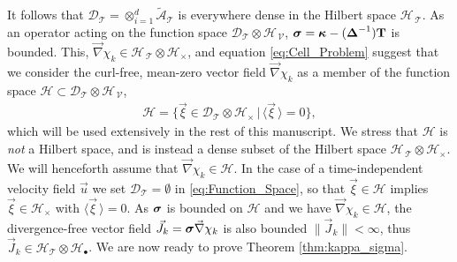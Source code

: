 \documentclass[11pt]{amsart}
\newcommand{\Tb}{\mathbf{T}}
\newcommand{\Tc}{\mathcal{T}}
\newcommand{\Vc}{\mathcal{V}}
\newcommand{\Hs}{\mathscr{H}}
\newcommand{\As}{\mathscr{A}}
\newcommand{\Ds}{\mathscr{D}}
\newcommand\bsig{\mbox{\boldmath${\sigma}$}}
\newcommand\bDelta{\mbox{\boldmath${\Delta}$}}
\newcommand\bkappa{\mbox{\boldmath${\kappa}$}}
\begin{document}
It follows that $\Ds_{\Tc}=\otimes_{i=1}^d\tilde{\As}_{\Tc}$ is everywhere
dense in the Hilbert space $\Hs_{\,\Tc}$. As an operator acting on the
function  space $\Ds_{\Tc}\otimes\Hs_{\,\Vc}$, $\bsig=\bkappa-(\bDelta^{-1})\Tb$ is
bounded. This, $\vec{\nabla}\chi_k\in\Hs_{\,\Tc}\otimes\Hs_\times$, and equation
\eqref{eq:Cell_Problem} suggest that we consider the curl-free,
mean-zero vector field $\vec{\nabla}\chi_k$ as a member of the function space 
$\Hs\subset\Ds_{\Tc}\otimes\Hs_{\,\Vc}$,   
%
\begin{align}\label{eq:Function_Space}
  \Hs=\{\vec{\xi}\in\Ds_{\Tc}\otimes\Hs_\times \,|\, \langle\vec{\xi}\,\rangle=0\},  
\end{align}
%
which will be used extensively in the rest of this manuscript. We
stress that $\Hs$ is \emph{not} a Hilbert space, and is instead a
dense subset of the Hilbert space $\Hs_{\,\Tc}\otimes\Hs_\times$. We will
henceforth assume that $\vec{\nabla}\chi_k\in\Hs$. In the case of a
time-independent velocity field $\vec{u}$ we set $\Ds_{\Tc}=\emptyset$ in 
\eqref{eq:Function_Space}, so that $\vec{\xi}\in\Hs$ implies 
$\vec{\xi}\in\Hs_\times$ with $\langle\vec{\xi}\,\rangle=0$. As $\bsig$ is bounded on $\Hs$
and we have $\vec{\nabla}\chi_k\in\Hs$, the divergence-free vector field
$\vec{J}_k=\bsig\vec{\nabla}\chi_k$ is also bounded $\|\vec{J}_k\|<\infty$, thus
$\vec{J}_k\in\Hs_{\Tc}\otimes\Hs_\bullet$. We are now ready to prove Theorem
\ref{thm:kappa_sigma}.  
\end{document}
